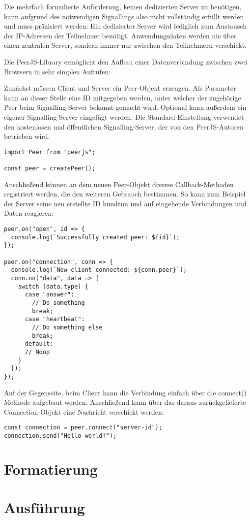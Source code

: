 Die mehrfach formulierte Anforderung, keinen dedizierten Server zu benötigen, kann aufgrund des notwendigen Signallings also nicht vollständig erfüllt werden und muss präzisiert werden: Ein dedizierter Server wird lediglich zum Austausch der IP-Adressen der Teilnehmer benötigt. Anwendungsdaten werden nie über einen zentralen Server, sondern immer nur zwischen den Teilnehmern verschickt.

Die PeerJS-Library ermöglicht den Aufbau einer Datenverbindung zwischen zwei Browsern in sehr simplen Aufrufen:

Zunächst müssen Client und Server ein Peer-Objekt erzeugen. Als Parameter kann an dieser Stelle eine ID mitgegeben werden, unter welcher der zugehörige Peer beim Signalling-Server bekannt gemacht wird. Optional kann außerdem ein eigener Signalling-Server eingefügt werden. Die Standard-Einstellung verwendet den kostenlosen und öffentlichen Signalling-Server, der von den PeerJS-Autoren betrieben wird.

\begin{lstlisting}
import Peer from "peerjs";

const peer = createPeer();
\end{lstlisting}

Anschließend können an dem neuen Peer-Objekt diverse Callback-Methoden registriert werden, die den weiteren Gebrauch bestimmen. So kann zum Beispiel der Server seine neu erstellte ID kundtun und auf eingehende Verbindungen und Daten reagieren:

\begin{lstlisting}
peer.on("open", id => {
  console.log(`Successfully created peer: ${id}`);
});

peer.on("connection", conn => {
  console.log(`New client connected: ${conn.peer}`);
  conn.on("data", data => {
    switch (data.type) {
      case "answer":
        // Do something
        break;
      case "heartbeat":
        // Do something else
        break;
      default:
      // Noop
    }
  });
});
\end{lstlisting}

Auf der Gegenseite, beim Client kann die Verbindung einfach über die connect() Methode aufgebaut werden. Anschließend kann über das daraus zurückgelieferte Connection-Objekt eine Nachricht verschickt werden:

\begin{lstlisting}
const connection = peer.connect("server-id");
connection.send("Hello world!");
\end{lstlisting}


%
\section{Formatierung}
\label{chap:metriken}

%
\section{Ausführung}
\label{chap:ausfuehrung}
